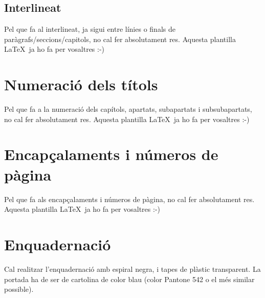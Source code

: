 \subsection{Interlineat}

Pel que fa al interlineat, ja sigui entre línies o finals de paràgrafs/seccions/capitols, no cal fer absolutament res. Aquesta plantilla \LaTeX \ ja ho fa per vosaltres :-)


\section{Numeració dels títols}

Pel que fa a la numeració dels capítols, apartats, subapartats i subsubapartats, no cal fer absolutament res. Aquesta plantilla \LaTeX \ ja ho fa per vosaltres :-)


\section{Encapçalaments i números de pàgina}

Pel que fa als encapçalaments i números de pàgina, no cal fer absolutament res. Aquesta plantilla \LaTeX \ ja ho fa per vosaltres :-)


\section{Enquadernació}

Cal realitzar l'enquadernació amb espiral negra, i tapes de plàstic transparent. La portada ha de ser de cartolina de color blau (color Pantone 542 o el més similar possible).